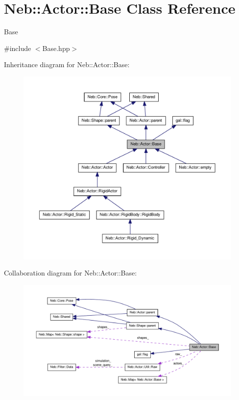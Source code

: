 \hypertarget{classNeb_1_1Actor_1_1Base}{\section{\-Neb\-:\-:\-Actor\-:\-:\-Base \-Class \-Reference}
\label{classNeb_1_1Actor_1_1Base}
}


\-Base  




{\ttfamily \#include $<$\-Base.\-hpp$>$}



\-Inheritance diagram for \-Neb\-:\-:\-Actor\-:\-:\-Base\-:\nopagebreak
\begin{figure}[H]
\begin{center}
\leavevmode
\includegraphics[width=350pt]{classNeb_1_1Actor_1_1Base__inherit__graph}
\end{center}
\end{figure}


\-Collaboration diagram for \-Neb\-:\-:\-Actor\-:\-:\-Base\-:\nopagebreak
\begin{figure}[H]
\begin{center}
\leavevmode
\includegraphics[width=350pt]{classNeb_1_1Actor_1_1Base__coll__graph}
\end{center}
\end{figure}
